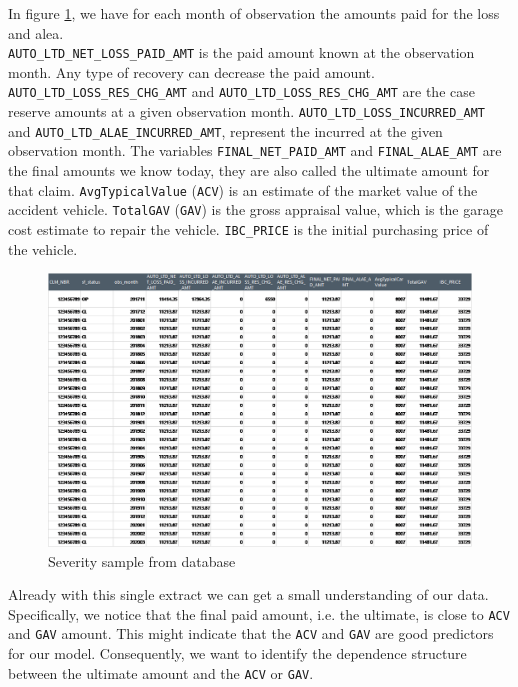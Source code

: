	In figure \ref{Fig_sample_2}, we have for each month of observation the amounts paid for the loss and alea.\\
	\texttt{AUTO\_LTD\_NET\_LOSS\_PAID\_AMT} is the paid amount known at the observation month. Any type of recovery can decrease the paid amount. \texttt{AUTO\_LTD\_LOSS\_RES\_CHG\_AMT} and \texttt{AUTO\_LTD\_LOSS\_RES\_CHG\_AMT} are the case reserve amounts at a given observation month. \texttt{AUTO\_LTD\_LOSS\_INCURRED\_AMT} and \texttt{AUTO\_LTD\_ALAE\_INCURRED\_AMT}, represent the incurred at the given observation month. The variables \texttt{FINAL\_NET\_PAID\_AMT} and \texttt{FINAL\_ALAE\_AMT} are the final amounts we know today, they are also called the ultimate amount for that claim. \texttt{AvgTypicalValue} (\texttt{ACV}) is an estimate of the market value of the accident vehicle. \texttt{TotalGAV} (\texttt{GAV}) is the gross appraisal value, which is the garage cost estimate to repair the vehicle. \texttt{IBC\_PRICE} is the initial purchasing price of the vehicle.\\
	\begin{figure}[H]
		\begin{center}
			\includegraphics[scale=0.4]{Graphiques/sample_2} 
			\renewcommand{\figurename}{Figure}
			\caption{Severity sample from database}\label{Fig_sample_2}
		\end{center}
	\end{figure}

	Already with this single extract we can get a small understanding of our data. Specifically, we notice that the final paid amount, i.e. the ultimate, is close to \texttt{ACV} and \texttt{GAV} amount. This might indicate that the \texttt{ACV} and \texttt{GAV} are good predictors for our model. Consequently, we want to identify the dependence structure between the ultimate amount and the \texttt{ACV} or \texttt{GAV}. \\
	
